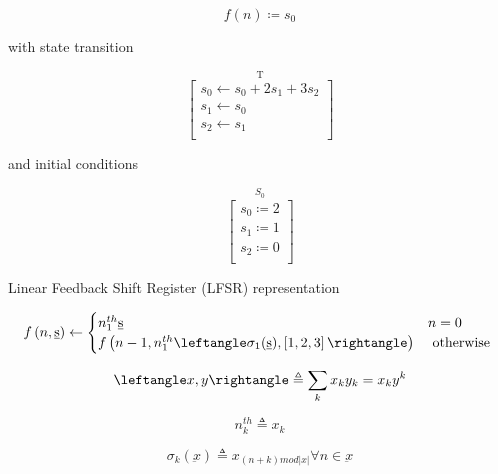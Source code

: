 \begin{equation}
f\left(n\right) \coloneqq s_0
\label{eq:direct_def}
\end{equation}

with state transition

\begin{equation}
\stackrel{\mbox{T}}{
\left[ \begin{array}{c}
s_0 \leftarrow s_0 + 2 s_1 + 3 s_2 \\
s_1 \leftarrow s_0 \\
s_2 \leftarrow s_1 \\
\end{array} \right]
}
\label{eq:direct_trans}
\end{equation}

and initial conditions

\begin{equation}
\stackrel{\mbox{$S_0$}}{
\left[ \begin{array}{c}
s_0 \coloneqq 2 \\
s_1 \coloneqq 1 \\
s_2 \coloneqq 0 \\
\end{array} \right]
}
\label{eq:direct_init}
\end{equation}

Linear Feedback Shift Register (LFSR) representation
\newline

\begin{equation}
f\left(n,\underbar{s}\right)
\leftarrow
\begin{cases}
n^{th}_1 \underbar{s} & n = 0 \\
f\left( n-1, n^{th}_1 \leftangle \sigma_{1}(\underbar{s}), \left[ 1,2,3 \right] \rightangle \right) & \mbox{ otherwise }
\end{cases}
\label{eq:lfsr_def}
\end{equation}

\begin{equation}
\leftangle x, y \rightangle
\triangleq
\sum_{k} x_k y_k 
= x_k y^k
\label{eq:dotprod}
\end{equation}

\begin{equation}
n^{th}_k
\triangleq
x_k
\label{eq:nth}
\end{equation}

\begin{equation}
\sigma_k \left( \underbar{x} \right)
\triangleq
x_{\left( n + k \right) mod |x|} \forall n \in \underbar{x}
\label{eq:rotate}
\end{equation}

